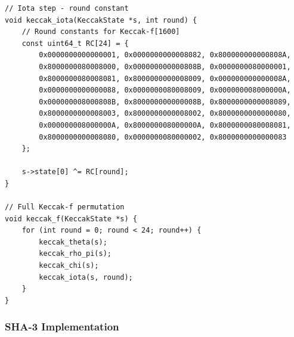 \begin{lstlisting}[style=cstyle, caption={Keccak-f[1600] Implementation}]
// Iota step - round constant
void keccak_iota(KeccakState *s, int round) {
    // Round constants for Keccak-f[1600]
    const uint64_t RC[24] = {
        0x0000000000000001, 0x0000000000008082, 0x800000000000808A,
        0x8000000080008000, 0x000000000000808B, 0x0000000080000001,
        0x8000000080008081, 0x8000000000008009, 0x000000000000008A,
        0x0000000000000088, 0x0000000080008009, 0x000000008000000A,
        0x000000008000808B, 0x800000000000008B, 0x8000000000008089,
        0x8000000000008003, 0x8000000000008002, 0x8000000000000080,
        0x000000008000000A, 0x800000008000000A, 0x8000000080008081,
        0x8000000000008080, 0x0000000080000002, 0x8000000000000083
    };
    
    s->state[0] ^= RC[round];
}

// Full Keccak-f permutation
void keccak_f(KeccakState *s) {
    for (int round = 0; round < 24; round++) {
        keccak_theta(s);
        keccak_rho_pi(s);
        keccak_chi(s);
        keccak_iota(s, round);
    }
}
\end{lstlisting}

\subsubsection{SHA-3 Implementation}

